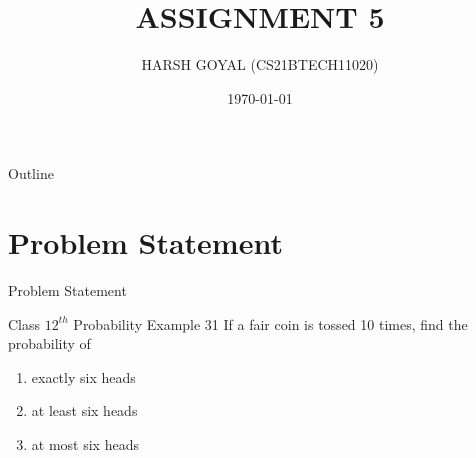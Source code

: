 \documentclass{beamer}
\title{ASSIGNMENT 5}
\author{HARSH GOYAL (CS21BTECH11020)}
\date{\today}
\begin{document}
\begin{frame}
    \titlepage 
\end{frame}

\logo{}


\begin{frame}{Outline}
    \tableofcontents
\end{frame}


\section{Problem Statement}
\begin{frame}{Problem Statement}
\begin{block}{Class $12^{th}$ Probability Example 31}
If a fair coin is tossed 10 times, find the probability of
    \begin{enumerate}
        \item exactly six heads
        \item at least six heads
        \item at most six heads
    \end{enumerate}
\end{block}

\end{frame}


\end{document}
